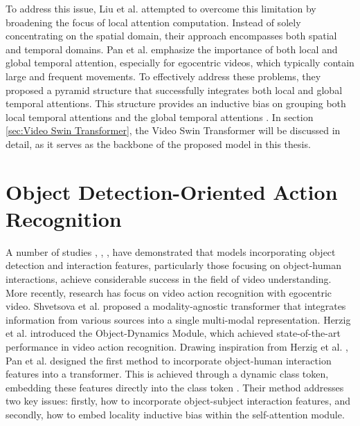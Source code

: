 To address this issue, Liu et al. \cite{liu_video_2021} attempted to overcome this limitation by broadening the focus of local attention computation.
Instead of solely concentrating on the spatial domain, their approach encompasses both spatial and temporal domains. Pan et al. \cite{pan_egovit_2023} emphasize the importance of both local and global temporal attention, especially for egocentric videos, which typically contain large and frequent movements. To effectively address these problems, they proposed a pyramid structure that successfully integrates both local and global temporal attentions. This structure provides an inductive bias on grouping both local temporal attentions and the global temporal attentions \cite{pan_egovit_2023}.
In section \ref{sec:Video Swin Transformer}, the Video Swin Transformer will be discussed in detail, as it serves as the backbone of the proposed model in this thesis.

\section{Object Detection-Oriented Action Recognition}
\label{sec:Object detection-orientated video action recognition}
A number of studies \cite{ferrari_compositional_2018}, \cite{wang_symbiotic_2020}, \cite{baradel_object_2018}, \cite{xu_learning_2019} have demonstrated that models incorporating object detection and interaction features, particularly those focusing on object-human interactions, achieve considerable success in the field of video understanding.
More recently, research has focus on video action recognition with egocentric video.
Shvetsova et al. \cite{shvetsova_everything_2022} proposed a modality-agnostic transformer that integrates information from various sources into a single multi-modal representation.
Herzig et al. \cite{herzig_object-region_2022} introduced the Object-Dynamics Module, which achieved state-of-the-art performance in video action recognition.
Drawing inspiration from Herzig et al. \cite{herzig_object-region_2022}, Pan et al. \cite{pan_egovit_2023} designed the first method to incorporate object-human interaction features into a transformer.
This is achieved through a dynamic class token, embedding these features directly into the class token \cite{pan_egovit_2023}.
Their method addresses two key issues: firstly, how to incorporate object-subject interaction features, and secondly, how to embed locality inductive bias within the self-attention module.

